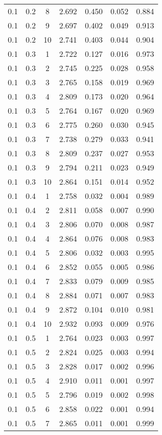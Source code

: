 \begin{tabular}{|c|c|c|c|c|c|c|}
0.1 & 0.2 & 8 & 2.692 & 0.450 & 0.052 & 0.884 \\
0.1 & 0.2 & 9 & 2.697 & 0.402 & 0.049 & 0.913 \\
0.1 & 0.2 & 10 & 2.741 & 0.403 & 0.044 & 0.904 \\
0.1 & 0.3 & 1 & 2.722 & 0.127 & 0.016 & 0.973 \\
0.1 & 0.3 & 2 & 2.745 & 0.225 & 0.028 & 0.958 \\
0.1 & 0.3 & 3 & 2.765 & 0.158 & 0.019 & 0.969 \\
0.1 & 0.3 & 4 & 2.809 & 0.173 & 0.020 & 0.964 \\
0.1 & 0.3 & 5 & 2.764 & 0.167 & 0.020 & 0.969 \\
0.1 & 0.3 & 6 & 2.775 & 0.260 & 0.030 & 0.945 \\
0.1 & 0.3 & 7 & 2.738 & 0.279 & 0.033 & 0.941 \\
0.1 & 0.3 & 8 & 2.809 & 0.237 & 0.027 & 0.953 \\
0.1 & 0.3 & 9 & 2.794 & 0.211 & 0.023 & 0.949 \\
0.1 & 0.3 & 10 & 2.864 & 0.151 & 0.014 & 0.952 \\
0.1 & 0.4 & 1 & 2.758 & 0.032 & 0.004 & 0.989 \\
0.1 & 0.4 & 2 & 2.811 & 0.058 & 0.007 & 0.990 \\
0.1 & 0.4 & 3 & 2.806 & 0.070 & 0.008 & 0.987 \\
0.1 & 0.4 & 4 & 2.864 & 0.076 & 0.008 & 0.983 \\
0.1 & 0.4 & 5 & 2.806 & 0.032 & 0.003 & 0.995 \\
0.1 & 0.4 & 6 & 2.852 & 0.055 & 0.005 & 0.986 \\
0.1 & 0.4 & 7 & 2.833 & 0.079 & 0.009 & 0.985 \\
0.1 & 0.4 & 8 & 2.884 & 0.071 & 0.007 & 0.983 \\
0.1 & 0.4 & 9 & 2.872 & 0.104 & 0.010 & 0.981 \\
0.1 & 0.4 & 10 & 2.932 & 0.093 & 0.009 & 0.976 \\
0.1 & 0.5 & 1 & 2.764 & 0.023 & 0.003 & 0.997 \\
0.1 & 0.5 & 2 & 2.824 & 0.025 & 0.003 & 0.994 \\
0.1 & 0.5 & 3 & 2.828 & 0.017 & 0.002 & 0.996 \\
0.1 & 0.5 & 4 & 2.910 & 0.011 & 0.001 & 0.997 \\
0.1 & 0.5 & 5 & 2.796 & 0.019 & 0.002 & 0.998 \\
0.1 & 0.5 & 6 & 2.858 & 0.022 & 0.001 & 0.994 \\
0.1 & 0.5 & 7 & 2.865 & 0.011 & 0.001 & 0.999 \\

\end{tabular}
